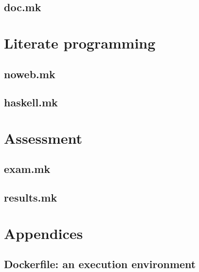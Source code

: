 \documentclass{report}
\begin{document}
\chapter{doc.mk}



\part{Literate programming}

\chapter{noweb.mk}


\chapter{haskell.mk}



\part{Assessment}

\chapter{exam.mk}


\chapter{results.mk}



\appendix
\part{Appendices}

\chapter{Dockerfile: an execution environment}


%


\printbibliography[heading=bibintoc]{}
\end{document}
